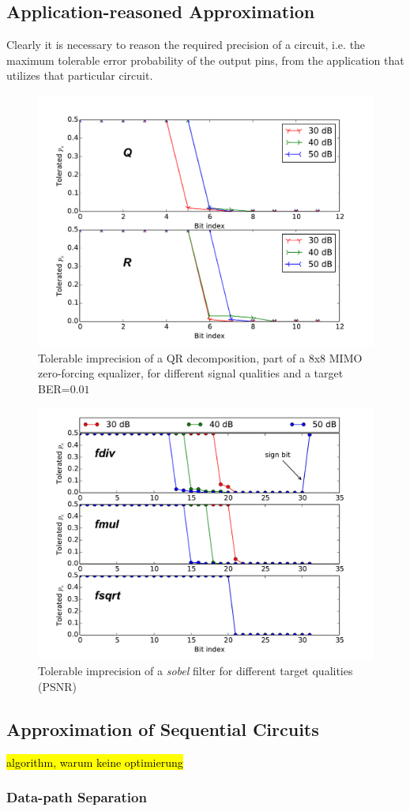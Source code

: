 \documentclass[conference]{IEEEtran}
\begin{document}
\subsection{Application-reasoned Approximation }
Clearly it is necessary to reason the required precision of a circuit, i.e. the maximum tolerable error probability of the output pins, from the application that utilizes that particular circuit. 
\begin{figure}[htb]
  \centering
  \includegraphics[width=.5\textwidth]{figs/metrics_qr}
  \caption{Tolerable imprecision of a QR decomposition, part of a 8x8 MIMO zero-forcing equalizer, for different signal qualities and a target BER=$0.01$}
  \label{fig:metrics_qr}
\end{figure}
\begin{figure}[htb]
  \centering
  \includegraphics[width=.5\textwidth]{figs/metrics_sobel}
  \caption{Tolerable imprecision of a \emph{sobel} filter for different target qualities (PSNR)}
  \label{fig:metrics_sobel}
\end{figure}


\subsection{Approximation of Sequential Circuits}
\hl{algorithm, warum keine optimierung}
\subsubsection{Data-path Separation}
\end{document}
